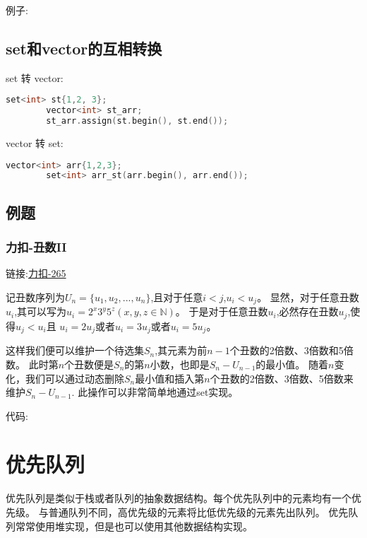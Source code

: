 \documentclass{article}
\begin{document}
    例子:
    

    \subsection{set和vector的互相转换}
    
    set 转 vector:
    \begin{lstlisting}[language=c++]
        set<int> st{1,2, 3};
        vector<int> st_arr;
        st_arr.assign(st.begin(), st.end());
    \end{lstlisting}

    vector 转 set:
    \begin{lstlisting}[language=c++]
        vector<int> arr{1,2,3};
        set<int> arr_st(arr.begin(), arr.end());
    \end{lstlisting}


    \subsection{例题}
    \subsubsection{力扣-丑数II}
    链接:\href{https://leetcode.cn/problems/ugly-number-ii/submissions/411470687/}{力扣-265}
    
    记丑数序列为$U_n = \{u_1,u_2,...,u_n\}$,且对于任意$i<j$,$u_i<u_j$。
    显然，对于任意丑数$u_i$,其可以写为$u_i = 2^x3^y5^z(x,y,z\in \mathbb{N})$。
    于是对于任意丑数$u_i$,必然存在丑数$u_j$,使得$u_j<u_i$且
    $u_i = 2u_j$或者$u_i = 3u_j$或者$u_i = 5u_j$。

    这样我们便可以维护一个待选集$S_n$,其元素为前$n-1$个丑数的2倍数、3倍数和5倍数。
    此时第$n$个丑数便是$S_n$的第$n$小数，也即是$S_n - U_{n-1}$的最小值。
    随着$n$变化，我们可以通过动态删除$S_n$最小值和插入第$n$个丑数的2倍数、3倍数、5倍数来维护$S_n - U_{n-1}$.
    此操作可以非常简单地通过set实现。
    
    代码:
    

    \section{优先队列}
    优先队列是类似于栈或者队列的抽象数据结构。每个优先队列中的元素均有一个优先级。
    与普通队列不同，高优先级的元素将比低优先级的元素先出队列。
    优先队列常常使用堆实现，但是也可以使用其他数据结构实现。
\end{document}
